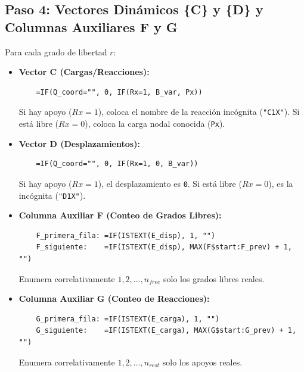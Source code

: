 \documentclass[11pt,a4paper]{article}
\begin{document}
\subsection{Paso 4: Vectores Dinámicos \{C\} y \{D\} y Columnas Auxiliares F y G}
Para cada grado de libertad $r$:
\begin{itemize}
    \item \textbf{Vector C (Cargas/Reacciones):}
    \begin{verbatim}
    =IF(Q_coord="", 0, IF(Rx=1, B_var, Px))
    \end{verbatim}
    Si hay apoyo ($Rx=1$), coloca el nombre de la reacción incógnita (\texttt{"C1X"}). Si está libre ($Rx=0$), coloca la carga nodal conocida (\texttt{Px}).
    \item \textbf{Vector D (Desplazamientos):}
    \begin{verbatim}
    =IF(Q_coord="", 0, IF(Rx=1, 0, B_var))
    \end{verbatim}
    Si hay apoyo ($Rx=1$), el desplazamiento es \texttt{0}. Si está libre ($Rx=0$), es la incógnita (\texttt{"D1X"}).
    \item \textbf{Columna Auxiliar F (Conteo de Grados Libres):}
    \begin{verbatim}
    F_primera_fila: =IF(ISTEXT(E_disp), 1, "")
    F_siguiente:    =IF(ISTEXT(E_disp), MAX(F$start:F_prev) + 1, "")
    \end{verbatim}
    Enumera correlativamente $1, 2, \dots, n_{free}$ solo los grados libres reales.
    \item \textbf{Columna Auxiliar G (Conteo de Reacciones):}
    \begin{verbatim}
    G_primera_fila: =IF(ISTEXT(E_carga), 1, "")
    G_siguiente:    =IF(ISTEXT(E_carga), MAX(G$start:G_prev) + 1, "")
    \end{verbatim}
    Enumera correlativamente $1, 2, \dots, n_{rest}$ solo los apoyos reales.
\end{itemize}
\end{document}
